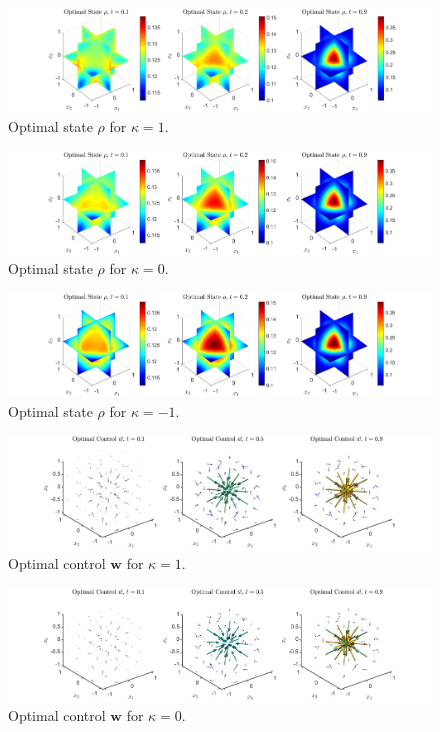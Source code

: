 \documentclass[11pt, a4paper]{article}
\theoremstyle{definition}
\newcommand{\w}{\mathbf{w}}
\begin{document}
	

	\begin{figure}[h]
		\centering
		\includegraphics[scale=0.35]{rhok1.png}
		\caption{Optimal state $\rho$ for $\kappa = 1$.} 
		\label{F2}
	\end{figure}
	\begin{figure}[h]
		\centering
		\includegraphics[scale=0.35]{rhok0.png}
		\caption{Optimal state $\rho$ for $\kappa = 0$.} 
		\label{F3}
	\end{figure}
	\begin{figure}[h]
		\centering
		\includegraphics[scale=0.35]{rhokn1.png}
		\caption{Optimal state $\rho$ for $\kappa = -1$.} 
		\label{F4}
	\end{figure}
%	
	\begin{figure}[h]
		\centering
		\includegraphics[scale=0.35]{Controlk1.png}
		\caption{Optimal control $\w$ for $\kappa = 1$.} 
		\label{F5}
	\end{figure}
	\begin{figure}[h]
		\centering
		\includegraphics[scale=0.35]{Controlk0.png}
		\caption{Optimal control $\w$ for $\kappa = 0$.} 
		\label{F6}
	\end{figure}
\end{document}
